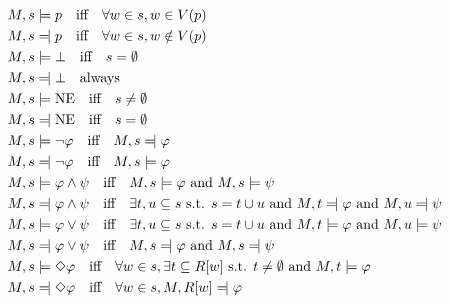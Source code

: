 \begin{align*}
M, s &\models p \quad \text{iff} \quad \forall w \in s, w \in V(p) \\
M, s &\leftmodels p \quad \text{iff} \quad \forall w \in s, w \notin V(p) \\
M, s &\models \bot \quad \text{iff} \quad s = \emptyset \\
M, s &\leftmodels \bot \quad \text{always} \\
M, s &\models \text{NE} \quad \text{iff} \quad s \neq \emptyset \\
M, s &\leftmodels  \text{NE} \quad \text{iff} \quad s = \emptyset \\
M, s &\models \neg \varphi \quad \text{iff} \quad M, s \leftmodels \varphi \\
M, s &\leftmodels  \neg \varphi \quad \text{iff} \quad M, s \models \varphi \\
M, s &\models \varphi \land \psi \quad \text{iff} \quad M, s \models \varphi \text{ and } M, s \models \psi \\
M, s &\leftmodels  \varphi \land \psi \quad \text{iff} \quad \exists t, u \subseteq s \text{ s.t. } s = t \cup u \text{ and } M, t \leftmodels \varphi \text{ and } M, u \leftmodels \psi \\
M, s &\models \varphi \lor \psi \quad \text{iff} \quad \exists t, u \subseteq s \text{ s.t. } s = t \cup u \text{ and } M, t \models \varphi \text{ and } M, u \models \psi \\
M, s &\leftmodels \varphi \lor \psi \quad \text{iff} \quad M, s \leftmodels \varphi \text{ and } M, s \leftmodels \psi \\
M, s &\models \Diamond \varphi \quad \text{iff} \quad \forall w \in s, \exists t \subseteq R[w] \text{ s.t. } t \neq \emptyset \text{ and } M, t \models \varphi \\
M, s &\leftmodels  \Diamond \varphi \quad \text{iff} \quad \forall w \in s, M, R[w] \leftmodels \varphi
\end{align*}